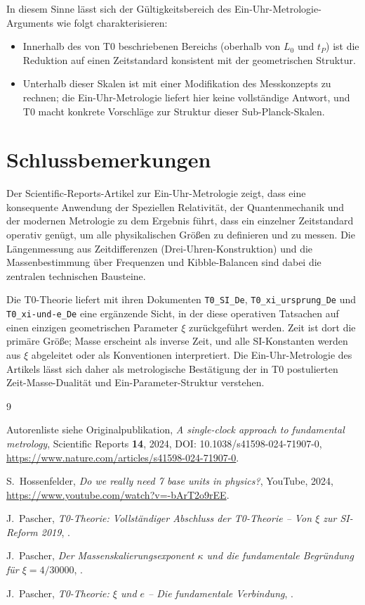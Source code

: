 In diesem Sinne lässt sich der Gültigkeitsbereich des
Ein-Uhr-Metrologie-Arguments wie folgt charakterisieren:
\begin{itemize}
  \item Innerhalb des von T0 beschriebenen Bereichs (oberhalb von $L_0$ und
        $t_P$) ist die Reduktion auf einen Zeitstandard konsistent mit der
        geometrischen Struktur.
  \item Unterhalb dieser Skalen ist mit einer Modifikation des
        Messkonzepts zu rechnen; die Ein-Uhr-Metrologie liefert hier keine
        vollständige Antwort, und T0 macht konkrete Vorschläge zur Struktur
        dieser Sub-Planck-Skalen.
\end{itemize}

\section{Schlussbemerkungen}

Der Scientific-Reports-Artikel zur Ein-Uhr-Metrologie zeigt, dass eine
konsequente Anwendung der Speziellen Relativität, der Quantenmechanik und der
modernen Metrologie zu dem Ergebnis führt, dass ein einzelner Zeitstandard
operativ genügt, um alle physikalischen Größen zu definieren und zu messen.
Die Längenmessung aus Zeitdifferenzen (Drei-Uhren-Konstruktion) und die
Massenbestimmung über Frequenzen und Kibble-Balancen sind dabei die zentralen
technischen Bausteine.

Die T0-Theorie liefert mit ihren Dokumenten \texttt{T0\_SI\_De},
\texttt{T0\_xi\_ursprung\_De} und \texttt{T0\_xi-und-e\_De} eine ergänzende
Sicht, in der diese operativen Tatsachen auf einen einzigen geometrischen
Parameter $\xi$ zurückgeführt werden. Zeit ist dort die primäre Größe;
Masse erscheint als inverse Zeit, und alle SI-Konstanten werden aus $\xi$
abgeleitet oder als Konventionen interpretiert. Die Ein-Uhr-Metrologie des
Artikels lässt sich daher als metrologische Bestätigung der in T0 postulierten
Zeit-Masse-Dualität und Ein-Parameter-Struktur verstehen.

\begin{thebibliography}{9}

Autorenliste siehe Originalpublikation,
\textit{A single-clock approach to fundamental metrology},
Scientific Reports \textbf{14}, 2024,
DOI: 10.1038/s41598-024-71907-0,
\url{https://www.nature.com/articles/s41598-024-71907-0}.

S.~Hossenfelder,
\textit{Do we really need 7 base units in physics?},
YouTube, 2024,
\url{https://www.youtube.com/watch?v=-bArT2o9rEE}.

J.~Pascher,
\textit{T0-Theorie: Vollständiger Abschluss der T0-Theorie – Von $\xi$ zur SI-Reform 2019},
.

J.~Pascher,
\textit{Der Massenskalierungsexponent $\kappa$ und die fundamentale Begründung für $\xi = 4/30000$},
.

J.~Pascher,
\textit{T0-Theorie: $\xi$ und $e$ – Die fundamentale Verbindung},
.

\end{thebibliography}
